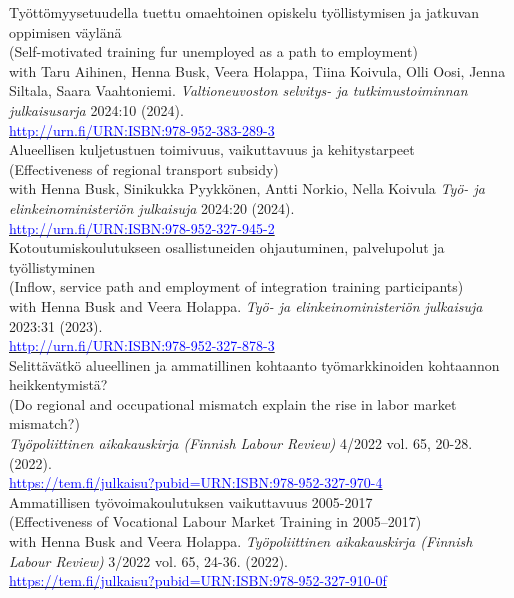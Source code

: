 \documentclass[16pt]{article}
\begin{document}
\noindent Työttömyysetuudella tuettu omaehtoinen opiskelu työllistymisen ja jatkuvan oppimisen väylänä\\
\noindent (Self-motivated training fur unemployed as a path to employment) \\
\noindent with Taru Aihinen, Henna Busk, Veera Holappa, Tiina Koivula, Olli Oosi, Jenna Siltala, Saara Vaahtoniemi. \textit{Valtioneuvoston selvitys- ja tutkimustoiminnan julkaisusarja} 2024:10 (2024). \\
\noindent \href{http://urn.fi/URN:ISBN:978-952-383-289-3}{\textcolor{blue}{http://urn.fi/URN:ISBN:978-952-383-289-3}} \\

\noindent Alueellisen kuljetustuen toimivuus, vaikuttavuus ja kehitystarpeet \\
\noindent (Effectiveness of regional transport subsidy) \\
\noindent with Henna Busk, Sinikukka Pyykkönen, Antti Norkio, Nella Koivula \textit{Työ- ja elinkeinoministeriön julkaisuja} 2024:20 (2024). \\
\noindent \href{http://urn.fi/URN:ISBN:978-952-327-945-2}{\textcolor{blue}{http://urn.fi/URN:ISBN:978-952-327-945-2}} \\

\noindent Kotoutumiskoulutukseen osallistuneiden ohjautuminen, palvelupolut ja työllistyminen\\
\noindent (Inflow, service path and employment of integration training participants) \\
\noindent with Henna Busk and Veera Holappa. \textit{Työ- ja elinkeinoministeriön julkaisuja} 2023:31 (2023). \\
\noindent \href{http://urn.fi/URN:ISBN:978-952-327-878-3}{\textcolor{blue}{http://urn.fi/URN:ISBN:978-952-327-878-3}} \\

\noindent Selittävätkö alueellinen ja ammatillinen kohtaanto työmarkkinoiden kohtaannon heikkentymistä?\\
\noindent (Do regional and occupational mismatch explain the rise in labor market mismatch?) \\
\noindent \textit{Työpoliittinen aikakauskirja (Finnish Labour Review)} 4/2022 vol. 65, 20-28.  (2022). \\
\noindent \href{https://tem.fi/julkaisu?pubid=URN:ISBN:978-952-327-970-4}{\textcolor{blue}{https://tem.fi/julkaisu?pubid=URN:ISBN:978-952-327-970-4}} \\

\noindent Ammatillisen työvoimakoulutuksen vaikuttavuus 2005-2017 \\
\noindent (Effectiveness of Vocational Labour Market Training in 2005–2017) \\
\noindent  with Henna Busk and Veera Holappa. \textit{Työpoliittinen aikakauskirja (Finnish Labour Review)} 3/2022 vol. 65, 24-36.  (2022).  \\
\noindent \href{https://tem.fi/julkaisu?pubid=URN:ISBN:978-952-327-910-0}{\textcolor{blue}{https://tem.fi/julkaisu?pubid=URN:ISBN:978-952-327-910-0f}} \\
\end{document}

